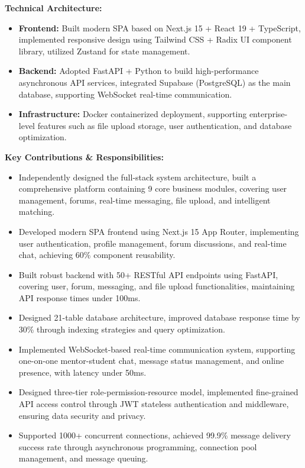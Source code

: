 \documentclass{resume}
\begin{document}
\textbf{Technical Architecture:}
\begin{itemize}
    \item \textbf{Frontend:} Built modern SPA based on Next.js 15 + React 19 + TypeScript, implemented responsive design using Tailwind CSS + Radix UI component library, utilized Zustand for state management.
    \item \textbf{Backend:} Adopted FastAPI + Python to build high-performance asynchronous API services, integrated Supabase (PostgreSQL) as the main database, supporting WebSocket real-time communication.
    \item \textbf{Infrastructure:} Docker containerized deployment, supporting enterprise-level features such as file upload storage, user authentication, and database optimization.
\end{itemize}

\textbf{Key Contributions \& Responsibilities:}
\begin{itemize}
    \item Independently designed the full-stack system architecture, built a comprehensive platform containing 9 core business modules, covering user management, forums, real-time messaging, file upload, and intelligent matching.
    \item Developed modern SPA frontend using Next.js 15 App Router, implementing user authentication, profile management, forum discussions, and real-time chat, achieving 60\% component reusability.
    \item Built robust backend with 50+ RESTful API endpoints using FastAPI, covering user, forum, messaging, and file upload functionalities, maintaining API response times under 100ms.
    \item Designed 21-table database architecture, improved database response time by 30\% through indexing strategies and query optimization.
    \item Implemented WebSocket-based real-time communication system, supporting one-on-one mentor-student chat, message status management, and online presence, with latency under 50ms.
    \item Designed three-tier role-permission-resource model, implemented fine-grained API access control through JWT stateless authentication and middleware, ensuring data security and privacy.
    \item Supported 1000+ concurrent connections, achieved 99.9\% message delivery success rate through asynchronous programming, connection pool management, and message queuing.
\end{itemize}
\end{document}
